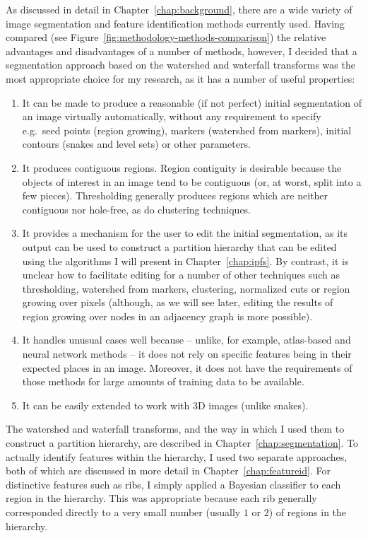 As discussed in detail in Chapter~\ref{chap:background}, there are a wide variety of image segmentation and feature identification methods currently used. Having compared (see Figure~\ref{fig:methodology-methods-comparison}) the relative advantages and disadvantages of a number of methods, however, I decided that a segmentation approach based on the watershed and waterfall transforms was the most appropriate choice for my research, as it has a number of useful properties:
%
\begin{enumerate}

\item It can be made to produce a reasonable (if not perfect) initial segmentation of an image virtually automatically, without any requirement to specify e.g.~seed points (region growing), markers (watershed from markers), initial contours (snakes and level sets) or other parameters.

\item It produces contiguous regions. Region contiguity is desirable because the objects of interest in an image tend to be contiguous (or, at worst, split into a few pieces). Thresholding generally produces regions which are neither contiguous nor hole-free, as do clustering techniques.

\item It provides a mechanism for the user to edit the initial segmentation, as its output can be used to construct a partition hierarchy that can be edited using the algorithms I will present in Chapter~\ref{chap:ipfs}. By contrast, it is unclear how to facilitate editing for a number of other techniques such as thresholding, watershed from markers, clustering, normalized cuts or region growing over pixels (although, as we will see later, editing the results of region growing over nodes in an adjacency graph is more possible).

\item It handles unusual cases well because -- unlike, for example, atlas-based and neural network methods -- it does not rely on specific features being in their expected places in an image. Moreover, it does not have the requirements of those methods for large amounts of training data to be available.

\item It can be easily extended to work with 3D images (unlike snakes).

\end{enumerate}
%
The watershed and waterfall transforms, and the way in which I used them to construct a partition hierarchy, are described in Chapter~\ref{chap:segmentation}. To actually identify features within the hierarchy, I used two separate approaches, both of which are discussed in more detail in Chapter~\ref{chap:featureid}. For distinctive features such as ribs, I simply applied a Bayesian classifier to each region in the hierarchy. This was appropriate because each rib generally corresponded directly to a very small number (usually $1$ or $2$) of regions in the hierarchy.

